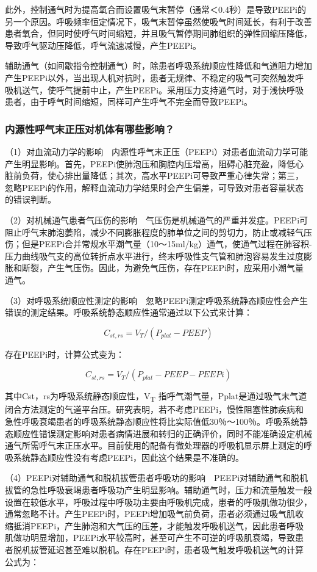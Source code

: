 此外，控制通气时为提高氧合而设置吸气末暂停（通常＜0.4秒）是导致PEEPi的另一个原因。呼吸频率恒定情况下，吸气末暂停虽然使吸气时间延长，有利于改善患者氧合，但同时使呼气时间缩短，并且吸气暂停期间肺组织的弹性回缩压降低，导致呼气驱动压降低，呼气流速减慢，产生PEEPi。

辅助通气（如间歇指令控制通气）时，除患者呼吸系统顺应性降低和气道阻力增加产生PEEPi以外，当出现人机对抗时，患者无规律、不稳定的吸气可突然触发呼吸机送气，使呼气提前中止，产生PEEPi。采用压力支持通气时，对于浅快呼吸患者，由于呼气时间缩短，同样可产生呼气不完全而导致PEEPi。

\subsubsection{内源性呼气末正压对机体有哪些影响？}

（1）对血流动力学的影响　内源性呼气末正压（PEEPi）对患者血流动力学可能产生明显影响。首先，PEEPi使肺泡压和胸腔内压增高，阻碍心脏充盈，降低心脏前负荷，使心排出量降低；其次，高水平PEEPi可导致严重心律失常；第三，忽略PEEPi的作用，解释血流动力学结果时会产生偏差，可导致对患者容量状态的错误判断。

（2）对机械通气患者气压伤的影响　气压伤是机械通气的严重并发症。PEEPi可阻止呼气末肺泡萎陷，减少不同膨胀程度的肺单位之间的剪切力，防止或减轻气压伤；但是PEEPi合并常规水平潮气量（10～15ml/kg）通气，使通气过程在肺容积-压力曲线吸气支的高位转折点水平进行，终末呼吸性支气管和肺泡容易发生过度膨胀和断裂，产生气压伤。因此，为避免气压伤，存在PEEPi时，应采用小潮气量通气。

（3）对呼吸系统顺应性测定的影响　忽略PEEPi测定呼吸系统静态顺应性会产生错误的测定结果。呼吸系统静态顺应性通常通过以下公式来计算：

\[C_{st,rs}=V_T/(P_{plat}-PEEP)\]

存在PEEPi时，计算公式变为：

\[C_{st,rs}=V_T/(P_{plat}-PEEP-PEEPi)\]

其中Cst，rs为呼吸系统静态顺应性，V\textsubscript{T}
指呼气潮气量，Pplat是通过吸气末气道闭合方法测定的气道平台压。研究表明，若不考虑PEEPi，慢性阻塞性肺疾病和急性呼吸衰竭患者的呼吸系统静态顺应性将比实际值低30％～100％。呼吸系统静态顺应性错误测定影响对患者病情进展和转归的正确评价，同时不能准确设定机械通气所需呼气末正压水平。目前使用的配备有微处理器的呼吸机显示屏上测定的呼吸系统静态顺应性没有考虑PEEPi，因此这个结果是不准确的。

（4）PEEPi对辅助通气和脱机拔管患者呼吸功的影响　PEEPi对辅助通气和脱机拔管的急性呼吸衰竭患者呼吸功产生明显影响。辅助通气时，压力和流量触发一般设置在较低水平，呼吸过程中呼吸功主要由呼吸机完成，患者的呼吸肌做功很少，通常忽略不计。产生PEEPi时，PEEPi增加吸气前负荷，患者必须通过吸气肌收缩抵消PEEPi，产生肺泡和大气压的压差，才能触发呼吸机送气，因此患者呼吸肌做功明显增加，PEEPi水平较高时，甚至可产生不可逆的呼吸肌衰竭，导致患者脱机拔管延迟甚至难以脱机。存在PEEPi时，患者吸气触发呼吸机送气的计算公式为：

